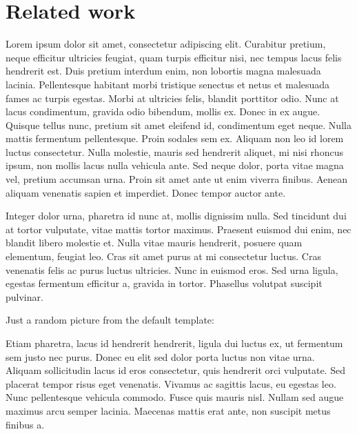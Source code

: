 \section{Related work}
Lorem ipsum dolor sit amet, consectetur adipiscing elit. Curabitur pretium, neque efficitur ultricies feugiat, quam turpis efficitur nisi, nec tempus lacus felis hendrerit est. Duis pretium interdum enim, non lobortis magna malesuada lacinia. Pellentesque habitant morbi tristique senectus et netus et malesuada fames ac turpis egestas. Morbi at ultricies felis, blandit porttitor odio. Nunc at lacus condimentum, gravida odio bibendum, mollis ex. Donec in ex augue. Quisque tellus nunc, pretium sit amet eleifend id, condimentum eget neque. Nulla mattis fermentum pellentesque. Proin sodales sem ex. Aliquam non leo id lorem luctus consectetur. Nulla molestie, mauris sed hendrerit aliquet, mi nisi rhoncus ipsum, non mollis lacus nulla vehicula ante. Sed neque dolor, porta vitae magna vel, pretium accumsan urna. Proin sit amet ante ut enim viverra finibus. Aenean aliquam venenatis sapien et imperdiet. Donec tempor auctor ante.

Integer dolor urna, pharetra id nunc at, mollis dignissim nulla. Sed tincidunt dui at tortor vulputate, vitae mattis tortor maximus. Praesent euismod dui enim, nec blandit libero molestie et. Nulla vitae mauris hendrerit, posuere quam elementum, feugiat leo. Cras sit amet purus at mi consectetur luctus. Cras venenatis felis ac purus luctus ultricies. Nunc in euismod eros. Sed urna ligula, egestas fermentum efficitur a, gravida in tortor. Phasellus volutpat suscipit pulvinar.

Just a random picture from the default template:
  

Etiam pharetra, lacus id hendrerit hendrerit, ligula dui luctus ex, ut fermentum sem justo nec purus. Donec eu elit sed dolor porta luctus non vitae urna. Aliquam sollicitudin lacus id eros consectetur, quis hendrerit orci vulputate. Sed placerat tempor risus eget venenatis. Vivamus ac sagittis lacus, eu egestas leo. Nunc pellentesque vehicula commodo. Fusce quis mauris nisl. Nullam sed augue maximus arcu semper lacinia. Maecenas mattis erat ante, non suscipit metus finibus a. 